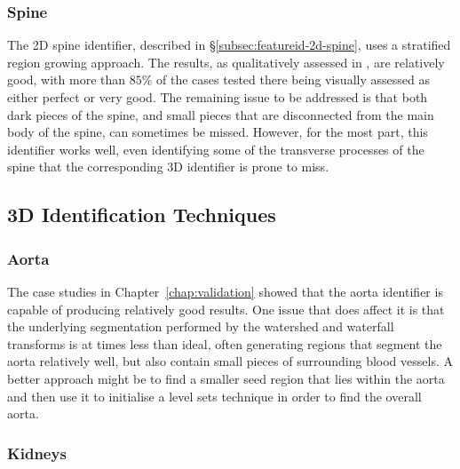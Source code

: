 \subsubsection{Spine}

The 2D spine identifier, described in \S\ref{subsec:featureid-2d-spine}, uses a stratified region growing approach. The results, as qualitatively assessed in \cite{gvcispa09}, are relatively good, with more than $85\%$ of the cases tested there being visually assessed as either perfect or very good. The remaining issue to be addressed is that both dark pieces of the spine, and small pieces that are disconnected from the main body of the spine, can sometimes be missed. However, for the most part, this identifier works well, even identifying some of the transverse processes of the spine that the corresponding 3D identifier is prone to miss.

\subsection{3D Identification Techniques}

\subsubsection{Aorta}

The case studies in Chapter~\ref{chap:validation} showed that the aorta identifier is capable of producing relatively good results. One issue that does affect it is that the underlying segmentation performed by the watershed and waterfall transforms is at times less than ideal, often generating regions that segment the aorta relatively well, but also contain small pieces of surrounding blood vessels. A better approach might be to find a smaller seed region that lies within the aorta and then use it to initialise a level sets technique in order to find the overall aorta.

\subsubsection{Kidneys}


